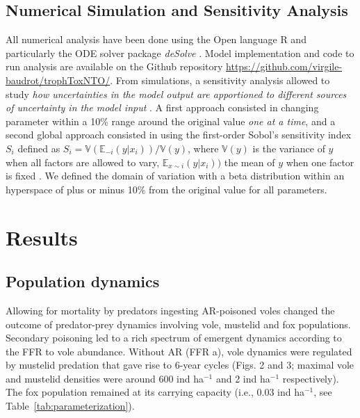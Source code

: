 \documentclass[11pt]{article}
\begin{document}
\subsection{Numerical Simulation and Sensitivity Analysis}

All numerical analysis have been done using the Open language R and particularly the ODE solver package \textit{deSolve} \citep{Soetaert2010}. Model implementation and code to run analysis are available on the Github repository \url{https://github.com/virgile-baudrot/trophToxNTO/}.
%
From simulations, a sensitivity analysis allowed to study \textit{how uncertainties in the model output are apportioned to different sources of uncertainty in the model input} \citep{Saltelli2019}.
%
A first approach consisted in changing parameter within a 10\% range around the original value \textit{one at a time}, and a second global approach consisted in using the first-order Sobol's sensitivity index $S_i$ defined as $S_i = \mathbb{V}(\mathbb{E}_{-i}(y \vert x_i)) / \mathbb{V}(y)$, where $\mathbb{V}(y)$ is the variance of $y$ when all factors are allowed to vary, $\mathbb{E}_{x\sim i}(y \vert x_i))$ the mean of $y$ when one factor is fixed \citep{Sobol1993}. We defined the domain of variation with a beta distribution within an hyperspace of plus or minus 10\% from the original value for all parameters.

\section{Results}

\subsection{Population dynamics}

Allowing for mortality by predators ingesting AR-poisoned voles changed the outcome of predator-prey dynamics involving vole, mustelid and fox populations. Secondary poisoning led to a rich spectrum of emergent dynamics according to the FFR to vole abundance.  
Without AR (FFR a), vole dynamics were regulated by mustelid predation that gave rise to 6-year cycles (Figs. 2 and 3; maximal vole and mustelid densities were around 600 ind ha$^{-1}$ and 2 ind ha$^{-1}$ respectively). The fox population remained at its carrying capacity (i.e., 0.03 ind ha$^{-1}$, see Table~\ref{tab:parameterization}).  
\end{document}
